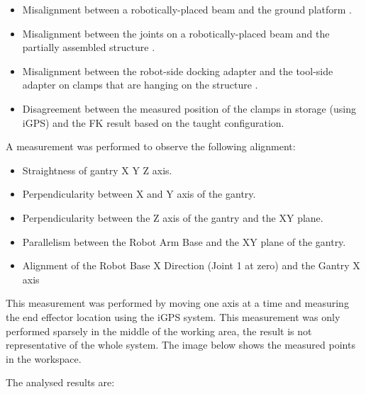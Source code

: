 \begin{itemize}
	\item Misalignment between a robotically-placed beam and the ground platform .

	\item Misalignment between the joints on a robotically-placed beam and the partially assembled structure .

	\item Misalignment between the robot-side docking adapter and the tool-side adapter on clamps that are hanging on the structure .

	\item Disagreement between the measured position of the clamps in storage (using iGPS) and the FK result based on the taught configuration.

\end{itemize}
A measurement was performed to observe the following alignment:

\begin{itemize}
	\item Straightness of gantry X Y Z axis.

	\item Perpendicularity between X and Y axis of the gantry.

	\item Perpendicularity between the Z axis of the gantry and the XY plane.

	\item Parallelism between the Robot Arm Base and the XY plane of the gantry.

	\item Alignment of the Robot Base X Direction (Joint 1 at zero) and the Gantry X axis

\end{itemize}
This measurement was performed by moving one axis at a time and measuring the end effector location using the iGPS system. This measurement was only performed sparsely in the middle of the working area, the result is not representative of the whole system. The image below shows the measured points in the workspace.




The analysed results are:

